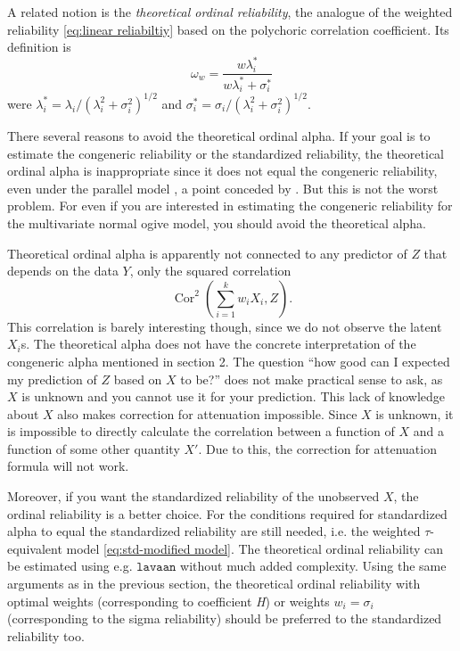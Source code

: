 \documentclass[twoside]{article}
\DeclareMathOperator{\Cor}{Cor}
\renewcommand{\sqrt}[1]{{(#1)^{1/2}}}
\begin{document}
A related notion is the \emph{theoretical ordinal reliability}, the
analogue of the weighted reliability \eqref{eq:linear reliabiltiy} based on the polychoric
correlation coefficient. Its definition is 
\begin{equation}
\omega_{w}=\frac{w\lambda_{i}^{*}}{w\lambda_{i}^{*}+\sigma_{i}^{*}}\label{eq:ordinal omega}
\end{equation}
were $\lambda_{i}^{*}=\lambda_{i}/\sqrt{\lambda_{i}^{2}+\sigma_{i}^{2}}$
and $\sigma_{i}^{*}=\sigma_{i}/\sqrt{\lambda_{i}^{2}+\sigma_{i}^{2}}$.

There several reasons to avoid the theoretical ordinal alpha. If your
goal is to estimate the congeneric reliability or the standardized
reliability, the theoretical ordinal alpha is inappropriate since
it does not equal the congeneric reliability, even under the parallel
model \citep[p. 1062, "Misconception 2"]{Chalmers2018-fj}, a point
conceded by \citet{Zumbo2019-lm}. But this is not the worst problem.
For even if you are interested in estimating the congeneric reliability
for the multivariate normal ogive model, you should avoid the theoretical
alpha.

Theoretical ordinal alpha is apparently not connected to any predictor
of $Z$ that depends on the data $Y$, only the squared correlation $$\Cor^{2}(\sum_{i=1}^{k}w_{i}X_{i},Z).$$
This correlation is barely interesting though, since we do not observe
the latent $X_{i}$s. The theoretical alpha does not have the concrete
interpretation of the congeneric alpha mentioned in section 2. The question
``how good can I expected my prediction of $Z$ based on $X$ to
be?'' does not make practical sense to ask, as $X$ is unknown and you cannot use it for your prediction. This
lack of knowledge about $X$ also makes correction for attenuation
impossible. Since $X$ is unknown, it is impossible to directly calculate
the correlation between a function of $X$ and a function of some
other quantity $X'$. Due to this, the correction for attenuation formula
will not work. 

Moreover, if you want the standardized reliability of the unobserved
$X$, the ordinal reliability is a better choice. For the conditions
required for standardized alpha to equal the standardized reliability
are still needed, i.e. the weighted $\tau$-equivalent model \eqref{eq:std-modified model}. The
theoretical ordinal reliability can be estimated using e.g. $\mathtt{lavaan}$
without much added complexity. Using the same arguments as in the
previous section, the theoretical ordinal reliability with optimal
weights (corresponding to coefficient \emph{H}) or weights $w_{i}=\sigma_{i}$
(corresponding to the sigma reliability) should be preferred to the
standardized reliability too.
\end{document}
